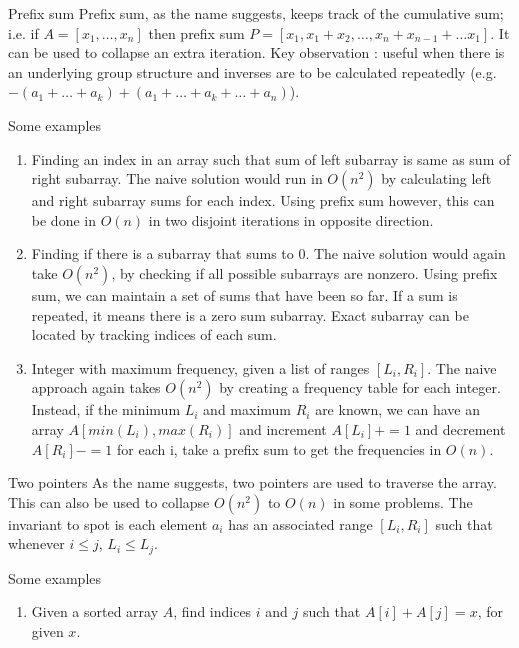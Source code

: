\documentclass[titlepage, 12pt]{book}
\begin{document}
\begin{algorithm}{Prefix sum}{}
    Prefix sum, as the name suggests, keeps track of the cumulative sum; i.e. if
    $A =  [x_1,\dots,x_n]$ then prefix sum $P = [x_1, x_1 + x_2,\dots,x_n + x_{n
    - 1} + \dots x_1]$. It can be used to collapse an extra iteration. Key
    observation : useful when there is an underlying group structure and
    inverses are to be calculated repeatedly (e.g. $-(a_1+\dots+a_k) +
    (a_1+\dots+a_k+\dots+a_n)$).

    Some examples
    \begin{enumerate}
        \item Finding an index in an array such that sum of left subarray is
            same as sum of right subarray. The naive solution would run in
            $O(n^2)$ by calculating left and right subarray sums for each index.
            Using prefix sum however, this can be done in $O(n)$ in two disjoint
            iterations in opposite direction.
        \item Finding if there is a subarray that sums to 0. The naive solution
            would again take $O(n^2)$, by checking if all possible subarrays are
            nonzero. Using prefix sum, we can maintain a set of sums that have
            been so far. If a sum is repeated, it means there is a zero sum
            subarray. Exact subarray can be located by tracking indices of each
            sum.
        \item Integer with maximum frequency, given a list of ranges $[L_i,
            R_i]$. The naive approach again takes $O(n^2)$ by creating a
            frequency table for each integer. Instead, if the minimum $L_i$ and
            maximum $R_i$ are known, we can have an array $A[min(L_i),
            max(R_i)]$ and increment $A[L_i] += 1$ and decrement $A[R_i] -= 1$
            for each i, take a prefix sum to get the frequencies in $O(n)$.
    \end{enumerate}
\end{algorithm}

\begin{algorithm}{Two pointers}{}
    As the name suggests, two pointers are used to traverse the array. This can
    also be used to collapse $O(n^2)$ to $O(n)$ in some problems. The invariant
    to spot is each element $a_i$ has an associated range $[L_i, R_i]$ such that
    whenever $i\leq j$, $L_i\leq L_j$.

    Some examples
    \begin{enumerate}
        \item Given a sorted array $A$, find indices $i$ and $j$ such that $A[i]
            + A[j] = x$, for given $x$.
    \end{enumerate}
\end{algorithm}
\end{document}
